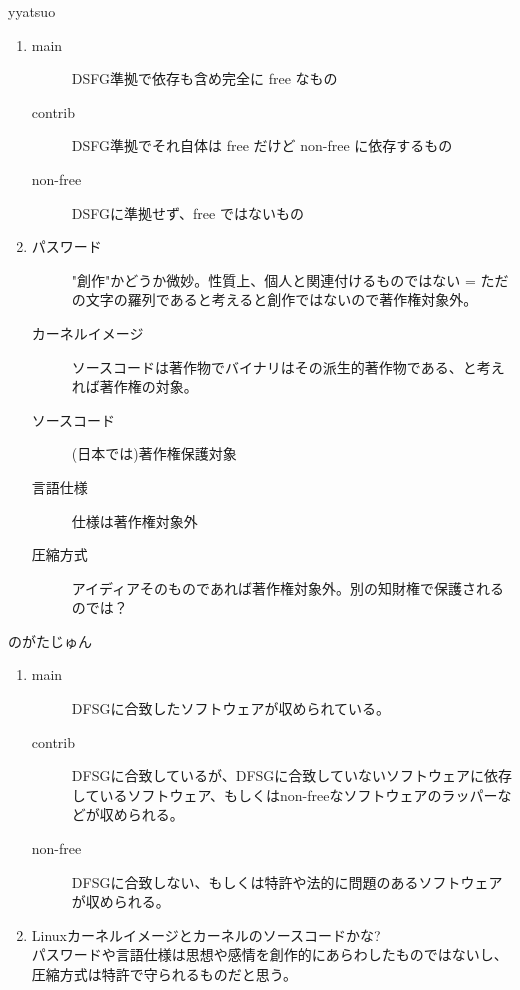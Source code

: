 \documentclass[mingoth,a4paper]{jsarticle}
\begin{document}
\begin{prework}{ yyatsuo }
  \begin{enumerate}
  \item
    \begin{description}
    \item [main] DSFG準拠で依存も含め完全に free なもの
    \item [contrib] DSFG準拠でそれ自体は free だけど non-free に依存するもの
    \item [non-free] DSFGに準拠せず、free ではないもの
    \end{description}
  \item
    \begin{description}
    \item [パスワード] "創作"かどうか微妙。性質上、個人と関連付けるものではない = ただの文字の羅列であると考えると創作ではないので著作権対象外。
    \item [カーネルイメージ] ソースコードは著作物でバイナリはその派生的著作物である、と考えれば著作権の対象。
    \item [ソースコード] (日本では)著作権保護対象
    \item [言語仕様] 仕様は著作権対象外
    \item [圧縮方式] アイディアそのものであれば著作権対象外。別の知財権で保護されるのでは？
    \end{description}
  \end{enumerate}
\end{prework}

\begin{prework}{ のがたじゅん }
  \begin{enumerate}
  \item
    \begin{description}
    \item [main] DFSGに合致したソフトウェアが収められている。
    \item [contrib] DFSGに合致しているが、DFSGに合致していないソフトウェアに依存しているソフトウェア、もしくはnon-freeなソフトウェアのラッパーなどが収められる。
    \item [non-free] DFSGに合致しない、もしくは特許や法的に問題のあるソフトウェアが収められる。
  \end{description}
  \item Linuxカーネルイメージとカーネルのソースコードかな?\\
    パスワードや言語仕様は思想や感情を創作的にあらわしたものではないし、圧縮方式は特許で守られるものだと思う。
  \end{enumerate}
\end{prework}
\end{document}
